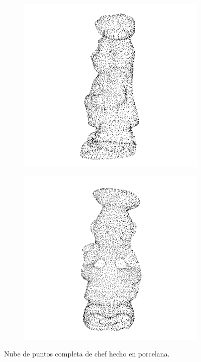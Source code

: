 \begin{figure}[t]
	\begin{subfigure}[b]{0.4\textwidth}
		\includegraphics[width=\textwidth]{img/ejemplos_nubes/chef_03.png}
	\end{subfigure}
	\quad
	\begin{subfigure}[b]{0.4\textwidth}
		\includegraphics[width=\textwidth]{img/ejemplos_nubes/chef_04.png}
	\end{subfigure}
	\caption{Nube de puntos completa de chef hecho en porcelana.}
	\label{fig:nube_completa}
\end{figure}

